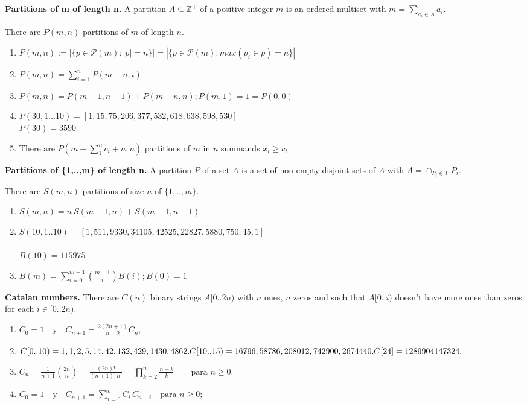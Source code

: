 \textbf{Partitions of m of length n.} A partition $A \subseteq \mathbb{Z}^{+}$ of a positive integer $m$ is an ordered multiset with $m=\sum_{a_i \in A} a_i$.

There are $P(m,n)$ partitions of $m$ of length $n$.
\begin{enumerate}
\item $P(m,n) := |\{p\in \mathcal{P}(m): |p|=n\}| = |\{p\in \mathcal{P}(m): max(p_i\in p)=n\}|$
\item $P(m,n) = \sum_{i=1}^n P(m-n,i)$
\item $P(m,n) = P(m-1,n-1)+P(m-n,n) ; P(m,1)=1=P(0,0)$
\item $P(30,1\dots 10) = [1,15,75,206,377,532,618,638,598,530]$\\
$P(30)=3590$
\item There are $P(m - \sum_1^n c_i + n,n)$ partitions of $m$ in $n$ summands $x_i\geq c_i$.
\end{enumerate}

\textbf{Partitions of \{1,..,m\} of length n.} A partition $P$ of a set $A$ is a set of non-empty disjoint sets of $A$ with $A = \cap_{P_i \in P} P_i$.

There are $S(m,n)$ partitions of size $n$ of $\{1,..,m\}$.
\begin{enumerate}
\item $S(m,n) = n\ S(m-1,n)+S(m-1,n-1)$
\item $S(10,1..10) = [1,511,9330,34105,42525,22827,5880,750,45,1]$\\\\
$B(10)=115975$
\item $B(m) = \sum_{i=0}^{m-1} \binom{m-1}{i} B(i) ; B(0)=1$
\end{enumerate}

\textbf{Catalan numbers.} There are $C(n)$ binary strings $A[0..2n)$ with $n$ ones, $n$ zeros and such that $A[0..i)$ doesn't have more ones than zeros for each $i \in [0..2n)$. 
\begin{enumerate}
\item $C_0 = 1 \quad \mbox{y} \quad C_{n+1}=\frac{2(2n+1)}{n+2}C_n,$
\item $C[0..10) = 1, 1, 2, 5, 14, 42, 132, 429, 1430, 4862.\\
C[10..15) = 16796, 58786, 208012, 742900, 2674440.\\
C[24] = 1289904147324.$
\item $C_n = \frac{1}{n+1}\binom{2n}{n} = \frac{(2n)!}{(n+1)!\,n!} = \prod\limits_{k=2}^{n}\frac{n+k}{k} \qquad\mbox{para }n\ge 0.$
\item $C_0 = 1 \quad \mbox{y} \quad C_{n+1}=\sum_{i=0}^{n}C_i\,C_{n-i}\quad\text{para }n\ge 0;$
\end{enumerate}

